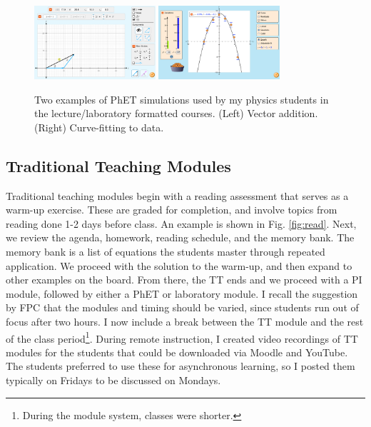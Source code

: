\documentclass[../../../main.tex]{subfiles}
\begin{document}
\begin{figure}
\centering
\includegraphics[width=0.4\textwidth]{figures/phet1.png}
\includegraphics[width=0.4\textwidth]{figures/phet2.png}
\caption{\label{fig:phet} Two examples of PhET simulations used by my physics students in the lecture/laboratory formatted courses.  (Left) Vector addition. (Right) Curve-fitting to data.}
\end{figure}

\subsection{Traditional Teaching Modules}
\label{sec:tt}

Traditional teaching modules begin with a reading assessment that serves as a warm-up exercise.  These are graded for completion, and involve topics from reading done 1-2 days before class.  An example is shown in Fig. \ref{fig:read}.  Next, we review the agenda, homework, reading schedule, and the memory bank.  The memory bank is a list of equations the students master through repeated application.  We proceed with the solution to the warm-up, and then expand to other examples on the board.  From there, the TT ends and we proceed with a PI module, followed by either a PhET or laboratory module.  I recall the suggestion by FPC that the modules and timing should be varied, since students run out of focus after two hours.  I now include a break between the TT module and the rest of the class period\footnote{During the module system, classes were shorter.}.  During remote instruction, I created video recordings of TT modules for the students that could be downloaded via Moodle and YouTube.  The students preferred to use these for asynchronous learning, so I posted them typically on Fridays to be discussed on Mondays.
\end{document}
